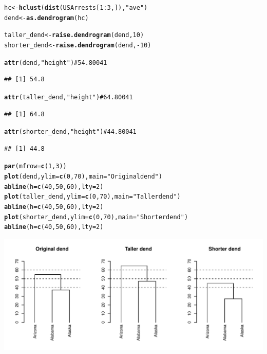 \documentclass[shortnames,nojss,article]{jss}\usepackage{graphicx, color}
\makeatletter
\def\maxwidth{ %
  \ifdim\Gin@nat@width>\linewidth
    \linewidth
  \else
    \Gin@nat@width
  \fi
}
\newcommand{\hlfunctioncall}[1]{\textcolor[rgb]{0.501960784313725,0,0.329411764705882}{\textbf{#1}}}%
\newcommand{\hlstring}[1]{\textcolor[rgb]{0.6,0.6,1}{#1}}%
\newenvironment{kframe}{%
 \def\at@end@of@kframe{}%
 \ifinner\ifhmode%
  \def\at@end@of@kframe{\end{minipage}}%
  \begin{minipage}{\columnwidth}%
 \fi\fi%
 \def\FrameCommand##1{\hskip\@totalleftmargin \hskip-\fboxsep
 \colorbox{shadecolor}{##1}\hskip-\fboxsep
     \hskip-\linewidth \hskip-\@totalleftmargin \hskip\columnwidth}%
 \MakeFramed {\advance\hsize-\width
   \@totalleftmargin\z@ \linewidth\hsize
   \@setminipage}}%
 {\par\unskip\endMakeFramed%
 \at@end@of@kframe}
\newenvironment{knitrout}{}{} %
\makeatother
\begin{document}
\begin{knitrout}
\color{fgcolor}\begin{kframe}
\begin{alltt}

hc <- \hlfunctioncall{hclust}(\hlfunctioncall{dist}(USArrests[1:3, ]), \hlstring{"ave"})
dend <- \hlfunctioncall{as.dendrogram}(hc)

taller_dend <- \hlfunctioncall{raise.dendrogram}(dend, 10)
shorter_dend <- \hlfunctioncall{raise.dendrogram}(dend, -10)

\hlfunctioncall{attr}(dend, \hlstring{"height"})  # 54.80041
\end{alltt}
\begin{verbatim}
## [1] 54.8
\end{verbatim}
\begin{alltt}
\hlfunctioncall{attr}(taller_dend, \hlstring{"height"})  # 64.80041
\end{alltt}
\begin{verbatim}
## [1] 64.8
\end{verbatim}
\begin{alltt}
\hlfunctioncall{attr}(shorter_dend, \hlstring{"height"})  # 44.80041
\end{alltt}
\begin{verbatim}
## [1] 44.8
\end{verbatim}
\begin{alltt}

\hlfunctioncall{par}(mfrow = \hlfunctioncall{c}(1, 3))
\hlfunctioncall{plot}(dend, ylim = \hlfunctioncall{c}(0, 70), main = \hlstring{"Original dend"})
\hlfunctioncall{abline}(h = \hlfunctioncall{c}(40, 50, 60), lty = 2)
\hlfunctioncall{plot}(taller_dend, ylim = \hlfunctioncall{c}(0, 70), main = \hlstring{"Taller dend"})
\hlfunctioncall{abline}(h = \hlfunctioncall{c}(40, 50, 60), lty = 2)
\hlfunctioncall{plot}(shorter_dend, ylim = \hlfunctioncall{c}(0, 70), main = \hlstring{"Shorter dend"})
\hlfunctioncall{abline}(h = \hlfunctioncall{c}(40, 50, 60), lty = 2)
\end{alltt}
\end{kframe}

{\centering \includegraphics[width=\maxwidth]{figure/unnamed-chunk-20} 

}



\end{knitrout}
\end{document}
